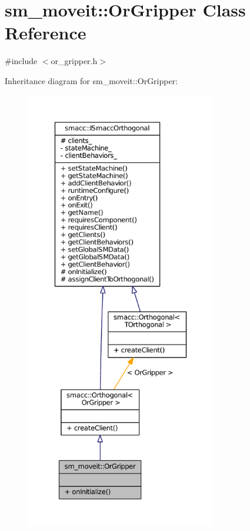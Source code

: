 \hypertarget{classsm__moveit_1_1OrGripper}{}\section{sm\+\_\+moveit\+:\+:Or\+Gripper Class Reference}
\label{classsm__moveit_1_1OrGripper}


{\ttfamily \#include $<$or\+\_\+gripper.\+h$>$}



Inheritance diagram for sm\+\_\+moveit\+:\+:Or\+Gripper\+:
\nopagebreak
\begin{figure}[H]
\begin{center}
\leavevmode
\includegraphics[height=550pt]{classsm__moveit_1_1OrGripper__inherit__graph}
\end{center}
\end{figure}


